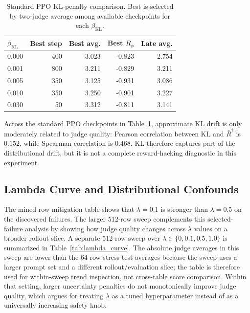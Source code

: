 \documentclass[twocolumn,10pt]{article}
\newcommand{\Rphi}{R_{\phi}}
\begin{document}
\begin{table}[!tbp]
\centering
\scriptsize
\caption{Standard PPO KL-penalty comparison. Best is selected by two-judge average among available checkpoints for each $\beta_{\mathrm{KL}}$.}
\label{tab:kl_beta_baseline}
\begin{tabular}{lrrrr}
\toprule
$\beta_{\mathrm{KL}}$ & Best step & Best avg. & Best $\Rphi$ & Late avg. \\
\midrule
0.000 & 400 & 3.023 & -0.823 & 2.754 \\
0.001 & 800 & 3.211 & -0.829 & 3.211 \\
0.005 & 350 & 3.125 & -0.931 & 3.086 \\
0.010 & 350 & 3.250 & -0.901 & 3.227 \\
0.030 & 50 & 3.312 & -0.811 & 3.141 \\
\bottomrule
\end{tabular}
\end{table}

Across the standard PPO checkpoints in Table~\ref{tab:kl_beta_baseline}, approximate KL drift is only moderately related to judge quality: Pearson correlation between KL and $\bar R^\dagger$ is $0.152$, while Spearman correlation is $0.468$. KL therefore captures part of the distributional drift, but it is not a complete reward-hacking diagnostic in this experiment.

\subsection{Lambda Curve and Distributional Confounds}
The mined-row mitigation table shows that $\lambda=0.1$ is stronger than $\lambda=0.5$ on the discovered failures. The larger 512-row sweep complements this selected-failure analysis by showing how judge quality changes across $\lambda$ values on a broader rollout slice. A separate 512-row sweep over $\lambda\in\{0,0.1,0.5,1.0\}$ is summarized in Table~\ref{tab:lambda_curve}. The absolute judge averages in this sweep are lower than the 64-row stress-test averages because the sweep uses a larger prompt set and a different rollout/evaluation slice; the table is therefore used for within-sweep trend inspection, not cross-table score comparison. Within that setting, larger uncertainty penalties do not monotonically improve judge quality, which argues for treating $\lambda$ as a tuned hyperparameter instead of as a universally increasing safety knob.
\end{document}
